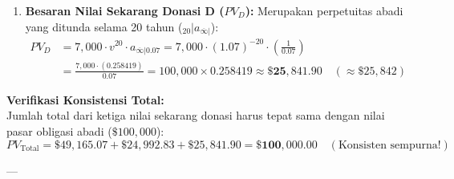\documentclass[11pt,a4paper]{article}
\begin{document}
\begin{examplebox}
\begin{enumerate}[label=\textbf{\arabic*.}]
    \item \textbf{Besaran Nilai Sekarang Donasi D ($PV_D$):}
    Merupakan perpetuitas abadi yang ditunda selama 20 tahun (${}_{20}| a_{\overline{\infty}|}$):
    \begin{align*}
        PV_D &= 7{,}000 \cdot v^{20} \cdot a_{\overline{\infty}|0.07} = 7{,}000 \cdot (1.07)^{-20} \cdot \left(\frac{1}{0.07}\right) \\
             &= \frac{7{,}000 \cdot (0.258419)}{0.07} = 100{,}000 \times 0.258419 \approx \mathbf{\$25{,}841.90} \quad (\approx \$25{,}842)
    \end{align*}
\end{enumerate}

\textbf{Verifikasi Konsistensi Total:}\\
Jumlah total dari ketiga nilai sekarang donasi harus tepat sama dengan nilai pasar obligasi abadi ($\$100{,}000$):
\begin{equation*}
    PV_{\text{Total}} = \$49{,}165.07 + \$24{,}992.83 + \$25{,}841.90 = \mathbf{\$100{,}000.00} \quad (\text{Konsisten sempurna!})
\end{equation*}
\end{examplebox}

---
\end{document}
